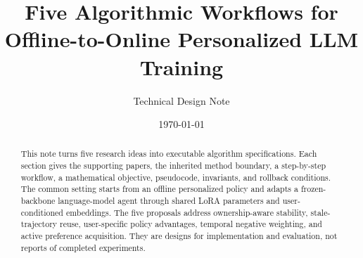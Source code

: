 \documentclass[11pt]{article}
\title{\bfseries Five Algorithmic Workflows for\\
Offline-to-Online Personalized LLM Training}
\author{Technical Design Note}
\date{\today}
\begin{document}
\maketitle

\begin{abstract}
This note turns five research ideas into executable algorithm specifications.
Each section gives the supporting papers, the inherited method boundary, a
step-by-step workflow, a mathematical objective, pseudocode, invariants, and
rollback conditions.  The common setting starts from an offline personalized
policy and adapts a frozen-backbone language-model agent through shared LoRA
parameters and user-conditioned embeddings.  The five proposals address
ownership-aware stability, stale-trajectory reuse, user-specific policy
advantages, temporal negative weighting, and active preference acquisition.
They are designs for implementation and evaluation, not reports of completed
experiments.
\end{abstract}

\tableofcontents
\newpage









\clearpage


\end{document}
